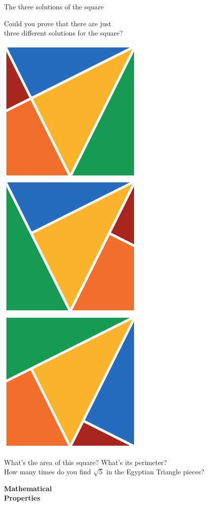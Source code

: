 \documentclass[14pt]{beamer}
\begin{document}

    \begin{frame}{The three solutions of the square}

        \vspace{-1em}
        \begin{center}
            Could you prove that there are just\\three different solutions for the square?

            \bigskip\bigskip

            \includegraphics[height=12ex]{figures/figure021a.pdf}\quad\includegraphics[height=12ex]{figures/figure021b.pdf}\quad\includegraphics[height=12ex]{figures/figure021c.pdf} \\

            \bigskip\bigskip

            {\footnotesize What's the area of this square? What's its perimeter?\\How many times do you find $\sqrt{5}$ in the Egyptian Triangle pieces?}
        \end{center}
    \end{frame}


    \begin{frame}{}
        \begin{center}
            \textbf{\Huge Mathematical\\\bigskip Properties}\\
        \end{center}
    \end{frame}
\end{document}
